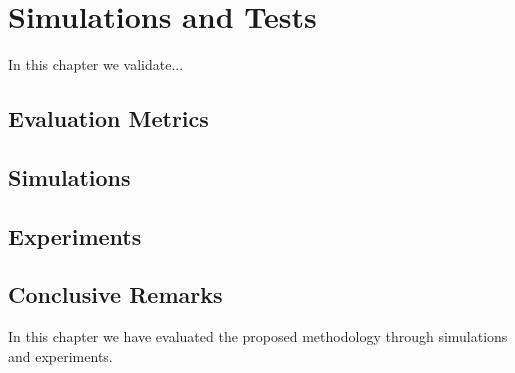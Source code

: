 \chapter{Simulations and Tests}
\label{chap:Simulations}
\thispagestyle{empty}

\vspace{0.5cm}

\noindent In this chapter we validate...


\section{Evaluation Metrics}
\label{sec:metrics}

\section{Simulations}

\section{Experiments}

\section{Conclusive Remarks}
In this chapter we have evaluated the proposed methodology through simulations and experiments.